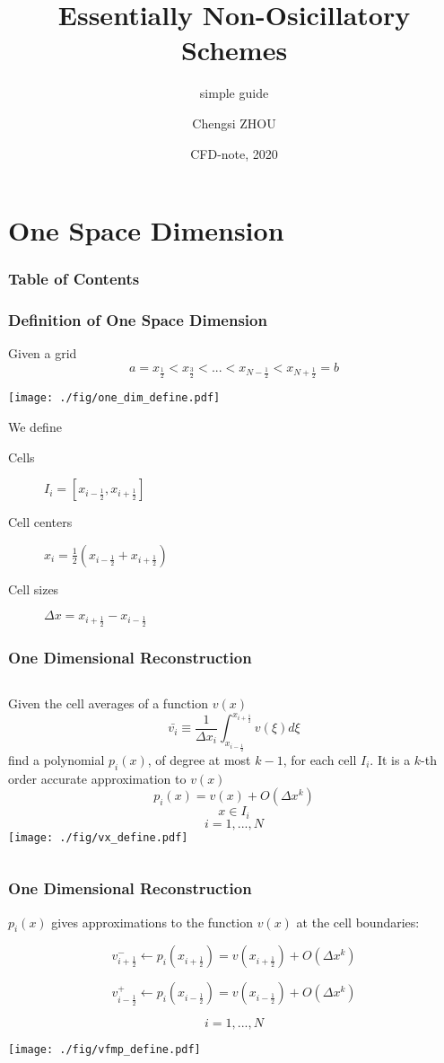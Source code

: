 \documentclass[MathSerif]{beamer}
\title[CFD-note] %
{Essentially Non-Osicillatory Schemes}
\subtitle{simple guide}
\author[Chengsi ZHOU] %
{Chengsi ZHOU}
\date[Feb 2020] %
{CFD-note, 2020}
\begin{document}
\section[Definition]{One Space Dimension}
\begin{frame}
	\frametitle{Table of Contents}
	\tableofcontents[]
\end{frame}

\begin{frame}
    \frametitle{Definition of One Space Dimension}
	Given a grid 
	\[ a = x_{\frac{1}{2}} < x_{\frac{3}{2}} < ... < x_{N-\frac{1}{2}} < x_{N + \frac{1}{2}} = b \]
\begin{center}
	\texttt{[image: ./fig/one\_dim\_define.pdf]}
\end{center}
	We define 
\begin{description}
	\item[Cells] \( I_i = [x_{i-\frac{1}{2}}, x_{i+\frac{1}{2}}]\)
	\item[Cell centers] \( x_i = \frac{1}{2} (x_{i-\frac{1}{2}} + x_{i+\frac{1}{2}})\)
	\item[Cell sizes] \( \Delta x = x_{i+\frac{1}{2}} - x_{i-\frac{1}{2}}\)
\end{description}
\end{frame}

\begin{frame}

\frametitle{One Dimensional Reconstruction}

\begin{columns}[T] %
    Given the cell averages of a function \( v(x) \) 
    \[ \bar{v_i} \equiv \frac{1}{\Delta x_i}  \int_{x_{i-\frac{1}{2}}}^{x_{i+\frac{1}{2}}} v(\xi) d \xi\]
    find a polynomial $p_i(x)$, of degree at most $k-1$, for each cell $I_i$. It is a $k$-th order accurate approximation to $v(x)$
    \[p_i(x) = v(x) + O(\Delta x^k)\]
    \[x \in I_i\]
    \[i=1,...,N\]
    \texttt{[image: ./fig/vx\_define.pdf]}
    \end{columns}

\end{frame}


\begin{frame}

\frametitle{One Dimensional Reconstruction}

$p_i(x)$ gives approximations to the function $v(x)$ at the cell boundaries:

\[ v^{-}_{i+\frac{1}{2}} \leftarrow p_i(x_{i+\frac{1}{2}}) = v(x_{i+\frac{1}{2}}) + O(\Delta x^k)\]

\[ v^{+}_{i-\frac{1}{2}} \leftarrow p_i(x_{i-\frac{1}{2}}) = v(x_{i-\frac{1}{2}}) + O(\Delta x^k)\]

\[ i = 1, ..., N\]
\begin{center}
\texttt{[image: ./fig/vfmp\_define.pdf]}
\end{center}

\end{frame}
  
\end{document}
